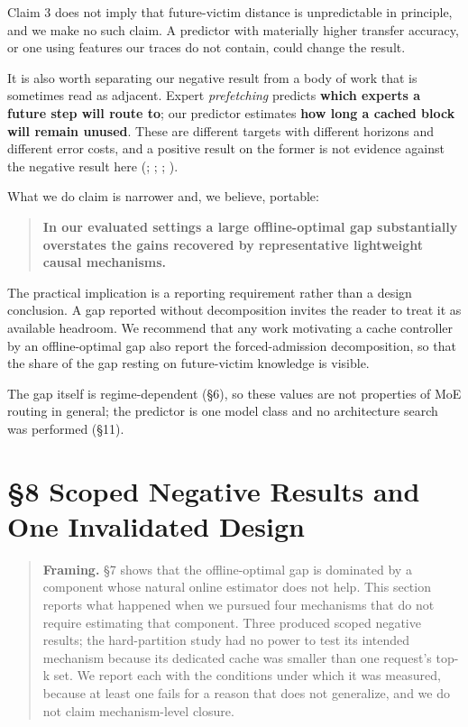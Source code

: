 \documentclass[
  10pt,
  letterpaper,
  10pt]{article}
\begin{document}
Claim 3 does not imply that future-victim distance is unpredictable in
principle, and we make no such claim. A predictor with materially higher
transfer accuracy, or one using features our traces do not contain,
could change the result.

It is also worth separating our negative result from a body of work that
is sometimes read as adjacent. Expert \emph{prefetching} predicts
\textbf{which experts a future step will route to}; our predictor
estimates \textbf{how long a cached block will remain unused}. These are
different targets with different horizons and different error costs, and
a positive result on the former is not evidence against the negative
result here (;
;
;
).

What we do claim is narrower and, we believe, portable:

\begin{quote}
\textbf{In our evaluated settings a large offline-optimal gap
substantially overstates the gains recovered by representative
lightweight causal mechanisms.}
\end{quote}

The practical implication is a reporting requirement rather than a
design conclusion. A gap reported without decomposition invites the
reader to treat it as available headroom. We recommend that any work
motivating a cache controller by an offline-optimal gap also report the
forced-admission decomposition, so that the share of the gap resting on
future-victim knowledge is visible.

The gap itself is regime-dependent (§6), so these values are not
properties of MoE routing in general; the predictor is one model class
and no architecture search was performed (§11).

\section{§8 Scoped Negative Results and One Invalidated
Design}\label{scoped-negative-results-and-one-invalidated-design}

\begin{quote}
\textbf{Framing.} §7 shows that the offline-optimal gap is dominated by
a component whose natural online estimator does not help. This section
reports what happened when we pursued four mechanisms that do not
require estimating that component. Three produced scoped negative
results; the hard-partition study had no power to test its intended
mechanism because its dedicated cache was smaller than one request's
top-k set. We report each with the conditions under which it was
measured, because at least one fails for a reason that does not
generalize, and we do not claim mechanism-level closure.
\end{quote}
\end{document}
